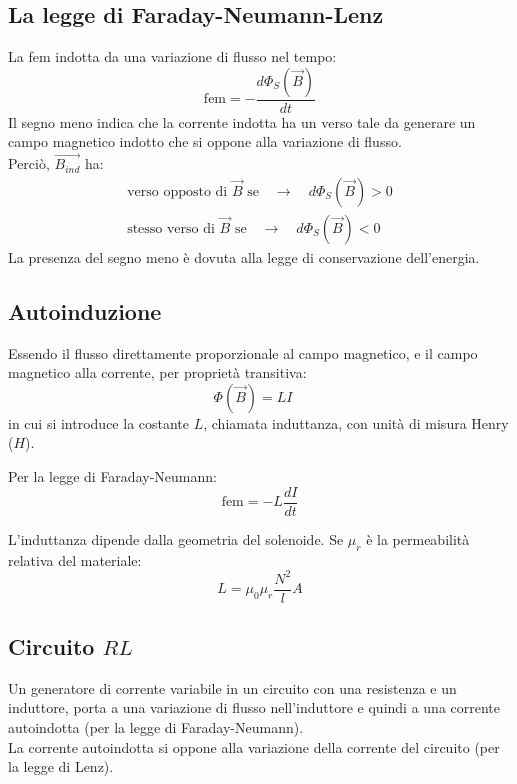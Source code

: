 \documentclass[12pt]{article}
\begin{document}
\subsection{La legge di Faraday-Neumann-Lenz}
La fem indotta da una variazione di flusso nel tempo:
$$ \text{fem} = -\frac{d\Phi_S(\vec{B})}{dt} $$
Il segno meno indica che la corrente indotta ha un verso tale da generare un campo magnetico indotto che si oppone alla variazione di flusso. \\
Perciò, $\vec{B_{ind}}$ ha:
\begin{align*}
    \text{verso opposto di $\vec{B}$ se} \hspace{1em} \rightarrow \hspace{1em} d\Phi_S(\vec{B}) > 0 \\
    \text{stesso verso di $\vec{B}$ se} \hspace{1em} \rightarrow \hspace{1em} d\Phi_S(\vec{B}) < 0
\end{align*}
La presenza del segno meno è dovuta alla legge di conservazione dell'energia.

\subsection{Autoinduzione}
Essendo il flusso direttamente proporzionale al campo magnetico, e il campo magnetico alla corrente, per proprietà transitiva:
$$ \Phi(\vec{B}) = LI \hspace{1em} $$
in cui si introduce la costante $L$, chiamata induttanza, con unità di misura Henry ($H$).

Per la legge di Faraday-Neumann:
$$ \text{fem} = -L \frac{dI}{dt} $$

L'induttanza dipende dalla geometria del solenoide. Se $\mu_r$ è la permeabilità relativa del materiale:
$$ L = \mu_0 \mu_r \frac{N^2}{l} A $$

\subsection{Circuito $RL$}
Un generatore di corrente variabile in un circuito con una resistenza e un induttore, porta a una variazione di flusso nell'induttore e quindi a una corrente autoindotta (per la legge di Faraday-Neumann). \\
La corrente autoindotta si oppone alla variazione della corrente del circuito (per la legge di Lenz).

\vspace{1em}
\end{document}
